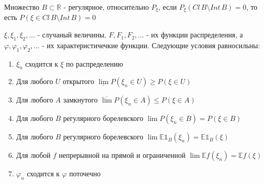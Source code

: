 \begin{definition}
    Множество $B \subset \mathbb{R}$ - регулярное, относительно $P_{\xi}$, если $P_{\xi} (Cl \, B \setminus Int \, B) = 0$,
    то есть $P(\xi \in Cl \, B \setminus Int \, B) = 0$
\end{definition}

\begin{theorem}
    $\xi, \xi_1, \xi_2, \ldots$ - случаный величины, $F, F_1, F_2, \ldots$ - их функции распределения, а
    $\varphi, \varphi_1, \varphi_2, \ldots$ - их характеристичечкие функции. Следующие условия равносильны:

    \begin{enumerate}
        \item $\xi_n$ сходится к $\xi$ по распределению
        \item Для любого $U$ открытого $\underline{\lim} P(\xi_n \in U) \geqslant P(\xi \in U)$
        \item Для любого $A$ замкнутого $\overline{\lim} P(\xi_n \in A) \leqslant P(\xi \in A)$
        \item Для любого $B$ регулярного борелевского $\lim P(\xi_n \in B) = P(\xi \in B)$
        \item Для любого $B$ регулярного борелевского $\lim \mathbb{E} \mathds{1}_{B}(\xi_n) = \mathbb{E} \mathds{1}_B (\xi)$
        \item Для любой $f$ непрерывной на прямой и ограниченной $\lim \mathbb{E} f(\xi_n) = \mathbb{E} f(\xi)$
        \item $\varphi_n$ сходится к $\varphi$ поточечно
    \end{enumerate}
\end{theorem}

